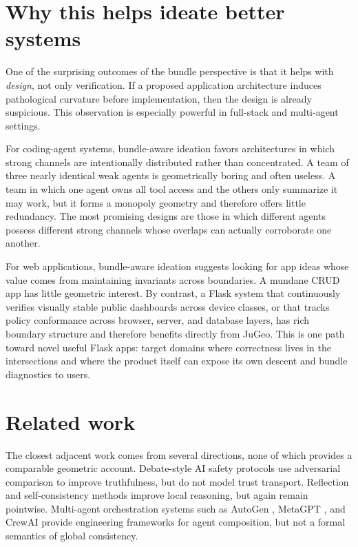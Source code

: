 \documentclass[11pt]{article}
\begin{document}
\section{Why this helps ideate better systems}\label{sec:ideation}

One of the surprising outcomes of the bundle perspective is that it helps with
\emph{design}, not only verification.  If a proposed application architecture
induces pathological curvature before implementation, then the design is already
suspicious.  This observation is especially powerful in full-stack and
multi-agent settings.

For coding-agent systems, bundle-aware ideation favors architectures in which
strong channels are intentionally distributed rather than concentrated.  A team
of three nearly identical weak agents is geometrically boring and often
useless.  A team in which one agent owns all tool access and the others only
summarize it may work, but it forms a monopoly geometry and therefore offers
little redundancy.  The most promising designs are those in which different
agents possess different strong channels whose overlaps can actually corroborate
one another.

For web applications, bundle-aware ideation suggests looking for app ideas whose
value comes from maintaining invariants across boundaries.  A mundane CRUD app
has little geometric interest.  By contrast, a Flask system that continuously
verifies visually stable public dashboards across device classes, or that tracks
policy conformance across browser, server, and database layers, has rich
boundary structure and therefore benefits directly from JuGeo.  This is one path
toward novel useful Flask apps: target domains where correctness lives in the
intersections and where the product itself can expose its own descent and bundle
diagnostics to users.

\section{Related work}\label{sec:related}

The closest adjacent work comes from several directions, none of which provides
a comparable geometric account.  Debate-style AI safety protocols
\cite{irving2018debate} use adversarial comparison to improve truthfulness, but
do not model trust transport.  Reflection and self-consistency methods improve
local reasoning, but again remain pointwise.  Multi-agent orchestration systems
such as AutoGen \cite{wu2023autogen}, MetaGPT \cite{hong2023metagpt}, and
CrewAI \cite{crewai2024} provide engineering frameworks for agent composition,
but not a formal semantics of global consistency.
\end{document}
